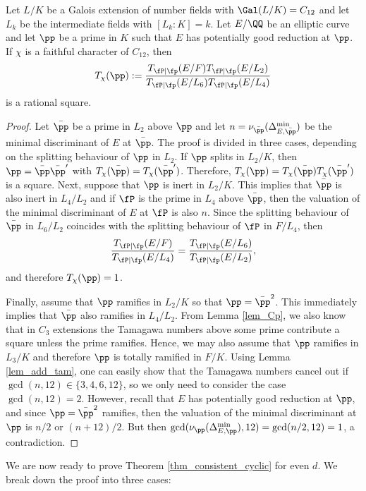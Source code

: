 \begin{lemma}
    Let $L/K$ be a Galois extension of number fields with $\Gal(L/K)=C_{12}$ and let $L_k$ be the intermediate fields with $[L_k:K]=k$. Let $E/\QQ$ be an elliptic curve and let $\pp$ be a prime in $K$ such that $E$ has potentially good reduction at $\pp$. If $\chi$ is a faithful character of $C_{12}$, then $$T_\chi(\pp):=\frac{T_{\fP\mid\fp}(E/F)T_{\fP\mid\fp}(E/L_2)}{T_{\fP\mid\fp}(E/L_6)T_{\fP\mid\fp}(E/L_4)}$$ is a rational square.
\end{lemma}
\begin{proof}
    Let $\bar\pp$ be a prime in $L_2$ above $\pp$ and let $n=\nu_{\bar\pp}(\Delta_{E,\bar\pp}^{\min})$ be the minimal discriminant of $E$ at $\bar\pp$. The proof is divided in three cases, depending on the splitting behaviour of $\pp$ in $L_2$. If $\pp$ splits in $L_2/K$, then $\pp=\bar\pp\bar\pp'$ with $T_\chi(\bar\pp)=T_\chi(\bar\pp')$. Therefore, $T_\chi(\pp)=T_\chi(\bar\pp)T_\chi(\bar\pp')$ is a square. Next, suppose that $\pp$ is inert in $L_2/K$. This implies that $\bar\pp$ is also inert in $L_4/L_2$ and if $\fP$ is the prime in $L_4$ above $\bar\pp$, then the valuation of the minimal discriminant of $E$ at $\fP$ is also $n$. Since the splitting behaviour of $\bar\pp$ in $L_6/L_2$ coincides with the splitting behaviour of $\fP$ in $F/L_4$, then 
    $$\frac{T_{\fP\mid\fp}(E/F)}{T_{\fP\mid\fp}(E/L_4)}=\frac{T_{\fP\mid\fp}(E/L_6)}{T_{\fP\mid\fp}(E/L_2)},$$
    and therefore $T_\chi(\pp)=1$.

    Finally, assume that $\pp$ ramifies in $L_2/K$ so that $\pp=\bar\pp^2$. This immediately implies that $\bar\pp$ also ramifies in $L_4/L_2$. From Lemma \ref{lem_Cp}, we also know that in $C_3$ extensions the Tamagawa numbers above some prime contribute a square unless the prime ramifies. Hence, we may also assume that $\pp$ ramifies in $L_3/K$ and therefore $\pp$ is totally ramified in $F/K$. Using Lemma \ref{lem_add_tam}, one can easily show that the Tamagawa numbers cancel out if $\gcd(n,12)\in\{3,4,6,12\}$, so we only need to consider the case $\gcd(n,12)=2$. However, recall that $E$ has potentially good reduction at $\pp$, and since $\pp=\bar\pp^2$ ramifies, then the valuation of the minimal discriminant at $\pp$ is $n/2$ or $(n+12)/2$. But then $\gcd(\nu_\pp(\Delta_{E,\pp}^{\min}),12)=\gcd(n/2,12)=1$, a contradiction.
\end{proof}


We are now ready to prove Theorem \ref{thm_consistent_cyclic} for even $d$. We break down the proof into three cases:

